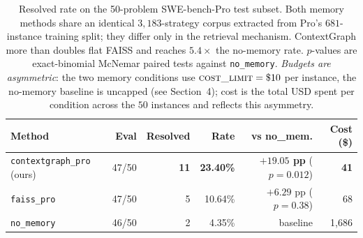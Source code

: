 \begin{table}[t]
\centering
\caption{Resolved rate on the 50-problem SWE-bench-Pro test subset. Both memory methods share an identical $3{,}183$-strategy corpus extracted from Pro's $681$-instance training split; they differ only in the retrieval mechanism. ContextGraph more than doubles flat FAISS and reaches $5.4\times$ the no-memory rate. $p$-values are exact-binomial McNemar paired tests against \texttt{no\_memory}. \emph{Budgets are asymmetric}: the two memory conditions use $\textsc{cost\_limit}=\$10$ per instance, the no-memory baseline is uncapped (see Section~4); cost is the total USD spent per condition across the $50$ instances and reflects this asymmetry.}
\label{tab:pro50}
\small
\begin{tabular}{lrrrrr}
\toprule
\textbf{Method} & \textbf{Eval} & \textbf{Resolved} & \textbf{Rate} & \textbf{vs no\_mem.} & \textbf{Cost (\$)} \\
\midrule
\texttt{contextgraph\_pro} (ours) & 47/50 & \textbf{11} & \textbf{23.40\%} & \textbf{$+19.05$ pp} ($p{=}0.012$) & \textbf{41} \\
\texttt{faiss\_pro} & 47/50 & 5 & 10.64\% & $+6.29$ pp ($p{=}0.38$) & 68 \\
\texttt{no\_memory} & 46/50 & 2 & 4.35\% & baseline & 1{,}686 \\
\bottomrule
\end{tabular}
\end{table}

